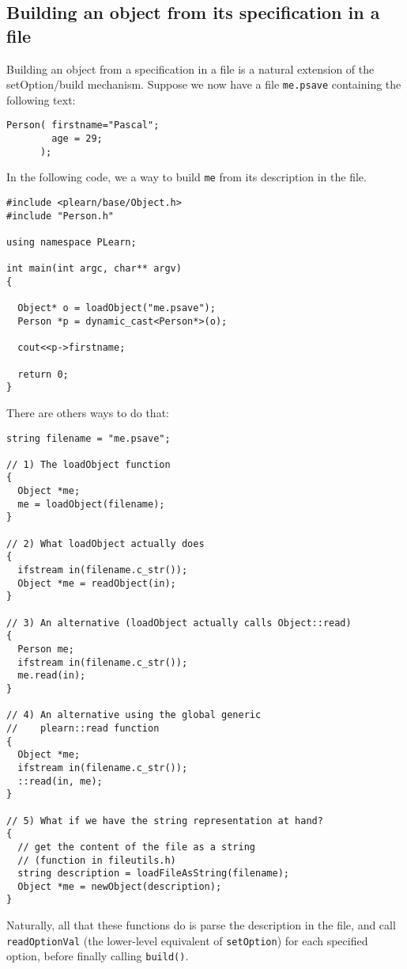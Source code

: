 \documentclass[11pt]{book}
\begin{document}
\subsection{Building an object from its specification in a file}

Building an object from a specification in a file is a natural
extension of the setOption/build mechanism.
Suppose we now have a file {\tt me.psave} containing the following text:

\begin{verbatim}
Person( firstname="Pascal"; 
        age = 29;
      );
\end{verbatim}

In the following code, we a way to build {\tt me} from its description
in the file.

\begin{verbatim}
#include <plearn/base/Object.h>
#include "Person.h"

using namespace PLearn;

int main(int argc, char** argv)
{

  Object* o = loadObject("me.psave"); 
  Person *p = dynamic_cast<Person*>(o);

  cout<<p->firstname;

  return 0;
}
\end{verbatim}


There are others ways to do that:

\begin{verbatim}
string filename = "me.psave";

// 1) The loadObject function
{
  Object *me;
  me = loadObject(filename);
}

// 2) What loadObject actually does
{
  ifstream in(filename.c_str());
  Object *me = readObject(in);
}

// 3) An alternative (loadObject actually calls Object::read)
{
  Person me; 
  ifstream in(filename.c_str());
  me.read(in);
}

// 4) An alternative using the global generic 
//    plearn::read function
{
  Object *me;
  ifstream in(filename.c_str());
  ::read(in, me);
}

// 5) What if we have the string representation at hand?
{
  // get the content of the file as a string
  // (function in fileutils.h)
  string description = loadFileAsString(filename);
  Object *me = newObject(description);
}
\end{verbatim}

Naturally, all that these functions do is parse the description in
the file, and call {\tt readOptionVal} (the lower-level equivalent
of {\tt setOption}) for each specified option, before finally calling
{\tt build()}.
\end{document}
